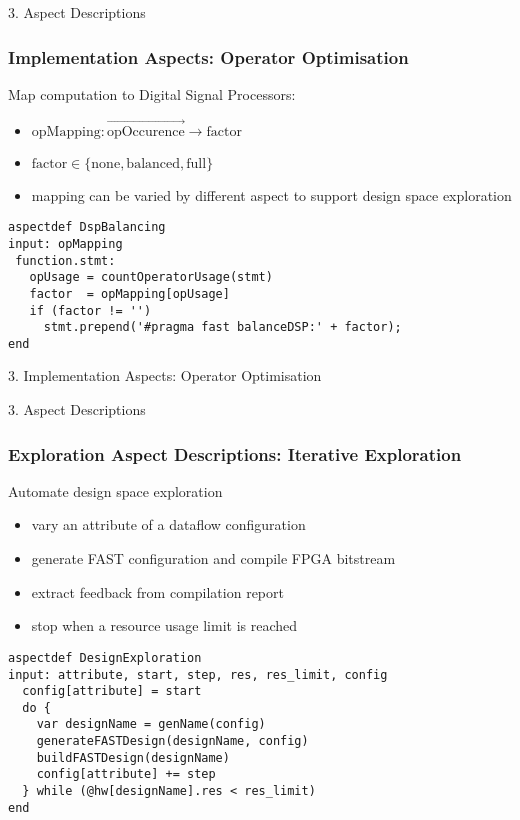 \begin{frame}[fragile]{3. Aspect Descriptions}
  \frametitle{Implementation Aspects: Operator Optimisation}
  Map computation to Digital Signal Processors:
  \begin{itemize}
  \item $ \text{opMapping} : \overrightarrow{\text{opOccurence}} \rightarrow \text{factor}$
  \item $\text{factor} \in \{\text{none}, \text{balanced}, \text{full}\} $
  \item mapping can be varied by different aspect to support design
    space exploration
  \end{itemize}
  \begin{lstlisting}[label=lst:label, style=lara]
aspectdef DspBalancing
input: opMapping
 function.stmt:
   opUsage = countOperatorUsage(stmt)
   factor  = opMapping[opUsage]
   if (factor != '')
     stmt.prepend('#pragma fast balanceDSP:' + factor);
end
  \end{lstlisting}
\end{frame}

\begin{frame}{3. Implementation Aspects: Operator Optimisation}
  \begin{figure}[!ht]
    \centering
    \def\svgwidth{\linewidth}
    
  \end{figure}

\end{frame}

\begin{frame}[fragile]{3. Aspect Descriptions}
  \frametitle{Exploration Aspect Descriptions: Iterative Exploration}
  Automate design space exploration
  \begin{itemize}
  \item vary an attribute of a dataflow configuration
  \item generate FAST configuration and compile FPGA bitstream
  \item extract feedback from compilation report
  \item stop when a resource usage limit is reached
  \end{itemize}
  \begin{lstlisting}[label=lst:label, style=lara]
aspectdef DesignExploration
input: attribute, start, step, res, res_limit, config
  config[attribute] = start
  do {
    var designName = genName(config)
    generateFASTDesign(designName, config)
    buildFASTDesign(designName)
    config[attribute] += step
  } while (@hw[designName].res < res_limit)
end
  \end{lstlisting}
\end{frame}

